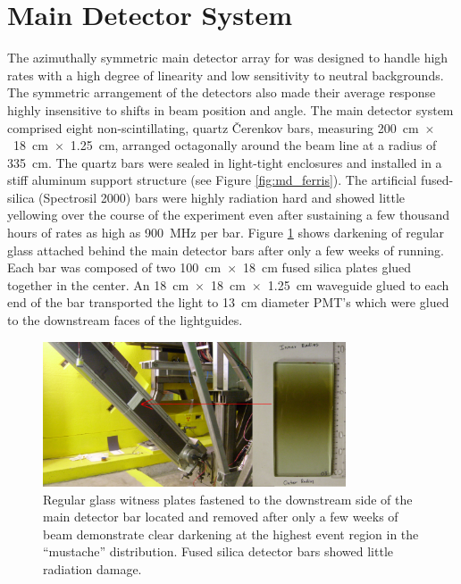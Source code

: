 \section{Main Detector System}
The azimuthally symmetric main detector array for \Qs was designed to handle high rates with a high degree of linearity and low sensitivity to neutral backgrounds. The symmetric arrangement of the detectors also made their average response highly insensitive to shifts in beam position and angle. The main detector system comprised eight non-scintillating, quartz \v{C}erenkov bars, measuring 200~cm~$\times$~18~cm~$\times$~1.25~cm, arranged octagonally around the beam line at a radius of 335~cm. The quartz bars were sealed in light-tight enclosures and installed in a stiff aluminum support structure (see Figure \ref{fig:md_ferris}). The artificial fused-silica (Spectrosil 2000) bars were highly radiation hard and showed little yellowing over the course of the experiment even after sustaining a few thousand hours of rates as high as 900~MHz per bar. Figure \ref{fig:witness_plate} shows darkening of regular glass attached behind the main detector bars after only a few weeks of running. Each bar was composed of two 100~cm~$\times$~18~cm fused silica plates glued together in the center. An 18~cm~$\times$~18~cm~$\times$~1.25~cm waveguide glued to each end of the bar transported the light to 13~cm diameter PMT's which were glued to the downstream faces of the lightguides. 
\begin{figure}[ht]
\centering
\includegraphics[width=0.8\textwidth]{Pictures/witness_plate.png}
\caption{Regular glass witness plates fastened to the downstream side of the main detector bar located and removed after only a few weeks of beam demonstrate clear darkening at the highest event region in the ``mustache'' distribution. Fused silica detector bars showed little radiation damage.}
\label{fig:witness_plate}
\end{figure}
